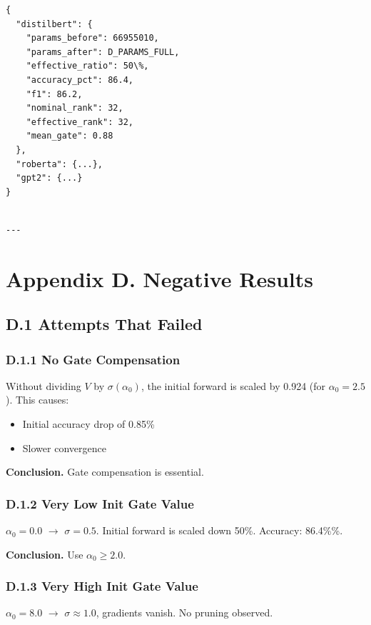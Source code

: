 \begin{lstlisting}
{
  "distilbert": {
    "params_before": 66955010,
    "params_after": D_PARAMS_FULL,
    "effective_ratio": 50\%,
    "accuracy_pct": 86.4,
    "f1": 86.2,
    "nominal_rank": 32,
    "effective_rank": 32,
    "mean_gate": 0.88
  },
  "roberta": {...},
  "gpt2": {...}
}
\end{lstlisting}
\begin{lstlisting}

---
\end{lstlisting}


\section{Appendix D. Negative Results}

\subsection{D.1 Attempts That Failed}

\subsubsection{D.1.1 No Gate Compensation}

Without dividing $V$ by $\sigma(\alpha_0)$, the initial forward is scaled 
by 0.924 (for $\alpha_0 = 2.5$). This causes:
\begin{itemize}
\item Initial accuracy drop of 0.85\%
\item Slower convergence

\end{itemize}
\textbf{Conclusion.} Gate compensation is essential.

\subsubsection{D.1.2 Very Low Init Gate Value}

$\alpha_0 = 0.0$ $\to$ $\sigma = 0.5$. Initial forward is scaled down 50\%. 
Accuracy: 86.4\%\%.

\textbf{Conclusion.} Use $\alpha_0 \geq 2.0$.

\subsubsection{D.1.3 Very High Init Gate Value}

$\alpha_0 = 8.0$ $\to$ $\sigma \approx 1.0$, gradients vanish. No pruning 
observed.

